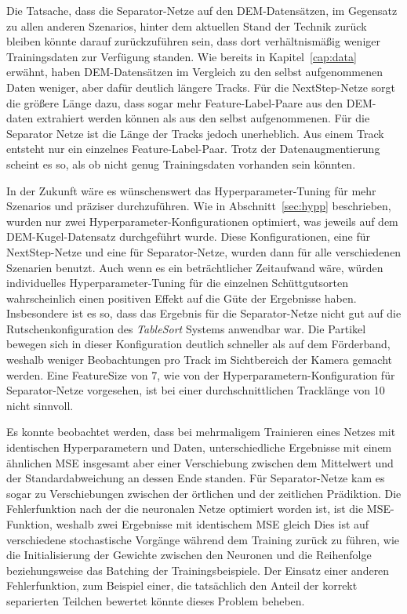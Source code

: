 
Die Tatsache, dass die Separator-Netze auf den DEM-Datensätzen, im Gegensatz zu allen anderen Szenarios,
hinter dem aktuellen Stand der Technik zurück bleiben könnte darauf zurückzuführen sein, 
dass dort verhältnismäßig weniger Trainingsdaten zur Verfügung standen.
Wie bereits in Kapitel~\ref{cap:data} erwähnt, haben DEM-Datensätzen im Vergleich zu den selbst aufgenommenen Daten weniger, aber dafür deutlich längere Tracks.
Für die NextStep-Netze sorgt die größere Länge dazu, dass sogar mehr Feature-Label-Paare aus den DEM-daten extrahiert werden können als aus den selbst aufgenommenen.
Für die Separator Netze ist die Länge der Tracks jedoch unerheblich.
Aus einem Track entsteht nur ein einzelnes Feature-Label-Paar.
Trotz der Datenaugmentierung scheint es so, als ob nicht genug Trainingsdaten vorhanden sein könnten.


In der Zukunft wäre es wünschenswert das Hyperparameter-Tuning für mehr Szenarios und präziser durchzuführen.
Wie in Abschnitt~\ref{sec:hypp} beschrieben, wurden nur zwei Hyperparameter-Konfigurationen optimiert, was jeweils auf dem DEM-Kugel-Datensatz durchgeführt wurde.
Diese Konfigurationen, eine für NextStep-Netze und eine für Separator-Netze,  wurden dann für alle verschiedenen Szenarien benutzt.
Auch wenn es ein beträchtlicher Zeitaufwand wäre, würden individuelles Hyperparameter-Tuning für die einzelnen Schüttgutsorten wahrscheinlich einen positiven Effekt auf die Güte der Ergebnisse haben.
Insbesondere ist es so, dass das Ergebnis für die Separator-Netze nicht gut auf die Rutschenkonfiguration des \textit{TableSort} Systems anwendbar war.
Die Partikel bewegen sich in dieser Konfiguration deutlich schneller als auf dem Förderband, weshalb weniger Beobachtungen pro Track im Sichtbereich der Kamera gemacht werden.
Eine FeatureSize von 7, wie von der Hyperparametern-Konfiguration für Separator-Netze vorgesehen, ist bei einer durchschnittlichen Tracklänge von 10 nicht sinnvoll.


Es konnte beobachtet werden, dass bei mehrmaligem Trainieren eines Netzes 
mit identischen Hyperparametern und Daten, unterschiedliche Ergebnisse mit einem ähnlichen MSE insgesamt aber einer Verschiebung zwischen dem Mittelwert und der Standardabweichung  
an dessen Ende standen.
Für Separator-Netze kam es sogar zu Verschiebungen zwischen der örtlichen und der zeitlichen Prädiktion.
Die Fehlerfunktion nach der die neuronalen Netze optimiert worden ist, ist die MSE-Funktion, weshalb zwei Ergebnisse mit identischem MSE gleich 
Dies ist auf verschiedene stochastische Vorgänge während dem Training zurück zu führen, wie die Initialisierung der Gewichte zwischen den Neuronen und die Reihenfolge beziehungsweise das Batching der Trainingsbeispiele.
Der Einsatz einer anderen Fehlerfunktion, zum Beispiel einer, die tatsächlich den Anteil der korrekt separierten Teilchen bewertet könnte dieses Problem beheben.
